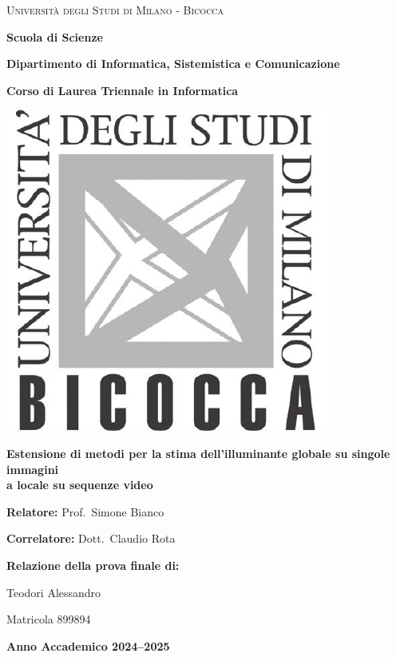 
\begin{titlepage}
  \centering

  {\LARGE\textsc{Università degli Studi di Milano - Bicocca}\par}
  \vspace{2mm}
  {\Large\textbf{Scuola di Scienze}\par}
  {\large\textbf{Dipartimento di Informatica, Sistemistica e Comunicazione}\par}
  {\normalsize\textbf{Corso di Laurea Triennale in Informatica}\par}

  \vspace{12mm}
  \includegraphics[scale=0.7]{img/logo-bicocca.pdf}

  \vspace{12mm}
  {\Huge\bfseries Estensione di metodi per la stima dell’illuminante globale su singole immagini \\ a locale su sequenze video\par}

  \vspace{20mm}
  \begin{flushleft}
    {\large \textbf{Relatore:} Prof.\ Simone Bianco\par}
    {\large \textbf{Correlatore:} Dott.\ Claudio Rota\par}
  \end{flushleft}

  \vspace{8mm}
  \begin{flushright}
    {\large \textbf{Relazione della prova finale di:}\par}
    {\large Teodori Alessandro\par}
    {\large Matricola 899894\par}
  \end{flushright}

  \vfill
  {\large\bfseries Anno Accademico 2024--2025\par}
\end{titlepage}

\restoregeometry
   
